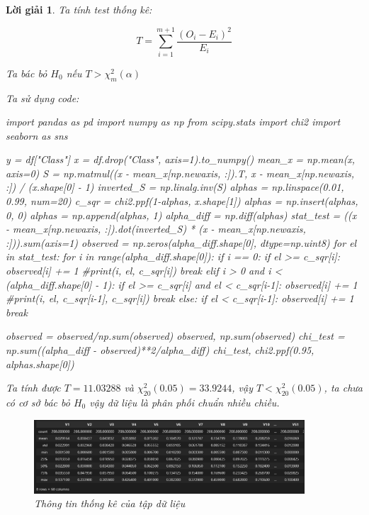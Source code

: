\documentclass[14pt, a4paper]{article}
\theoremstyle{sltheorem}
\theoremstyle{soltheorem}
\newtheorem*{loigiai}{Lời giải}
\begin{document}
\begin{loigiai}
    Ta tính test thống kê:

    \begin{equation*}
        T = \sum_{i=1}^{m+1} \dfrac{(O_i - E_i)^2}{E_i}
    \end{equation*}

    Ta bác bỏ $H_0$ nếu $T > \chi_m^2(\alpha)$

    Ta sử dụng code:

    \begin{python}
import pandas as pd
import numpy as np
from scipy.stats import chi2
import seaborn as sns

y = df["Class"]
x = df.drop("Class", axis=1).to_numpy()
mean_x = np.mean(x, axis=0)
S = np.matmul((x - mean_x[np.newaxis, :]).T, x - mean_x[np.newaxis, :]) / (x.shape[0] - 1)
inverted_S = np.linalg.inv(S)
alphas = np.linspace(0.01, 0.99, num=20)
c_sqr = chi2.ppf(1-alphas, x.shape[1])
alphas = np.insert(alphas, 0, 0)
alphas = np.append(alphas, 1)
alpha_diff = np.diff(alphas)
stat_test = ((x - mean_x[np.newaxis, :]).dot(inverted_S) * (x - mean_x[np.newaxis, :])).sum(axis=1)
observed = np.zeros(alpha_diff.shape[0], dtype=np.uint8)
for el in stat_test:
    for i in range(alpha_diff.shape[0]):
        if i == 0:
            if el >= c_sqr[i]:
                observed[i] += 1
                #print(i, el, c_sqr[i])
                break
        elif i > 0 and i < (alpha_diff.shape[0] - 1):
            if el >= c_sqr[i] and el < c_sqr[i-1]:
                observed[i] += 1
                #print(i, el, c_sqr[i-1], c_sqr[i])
                break
        else:
            if el < c_sqr[i-1]:
                observed[i] += 1
                break
            
                
observed = observed/np.sum(observed)
observed, np.sum(observed)
chi_test = np.sum((alpha_diff - observed)**2/alpha_diff)
chi_test, chi2.ppf(0.95, alphas.shape[0])
    \end{python}
    
    Ta tính được $T=11.03288$ và $\chi_20^2(0.05)=33.9244$, vậy $T < \chi_20^2(0.05)$, ta chưa có cơ sở bác bỏ $H_0$ vậy dữ liệu là phân phối chuẩn nhiều chiều.

    \begin{figure}[h!]
        \centering
        \includegraphics[width=0.9\textwidth]{figures/raw_summary.png}
        \caption{Thông tin thống kê của tập dữ liệu}
        \label{fig:raw_summary}
    \end{figure}


\end{loigiai}
\end{document}
